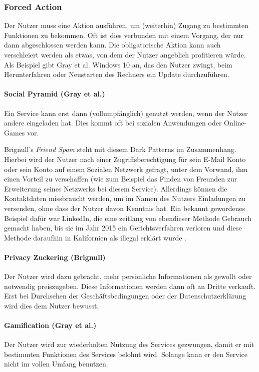 \documentclass[a4paper]{article}
\begin{document}
\subsubsection{Forced Action}
Der Nutzer muss eine Aktion ausführen, um (weiterhin) Zugang zu bestimmten Funktionen zu bekommen. Oft ist dies verbunden mit einem Vorgang, der nur dann abgeschlossen werden kann. Die obligatorische Aktion kann auch verschleiert werden als etwas, von dem der Nutzer angeblich profitieren würde. 
Als Beispiel gibt Gray et al. \cite{gray} Windows 10 an, das den Nutzer zwingt, beim Herunterfahren oder Neustarten des Rechners ein Update durchzuführen.  

\paragraph{Social Pyramid (Gray et al.)}
Ein Service kann erst dann (vollumpfänglich) genutzt werden, wenn der Nutzer andere eingeladen hat. Dies kommt oft bei sozialen Anwendungen oder Online-Games vor. 

Brignull's \textit{Friend Spam} steht mit diesem Dark Patterns im Zusammenhang. Hierbei wird der Nutzer nach einer Zugriffsberechtigung für sein E-Mail Konto oder sein Konto auf einem Sozialen Netzwerk gefragt, unter dem Vorwand, ihm einen Vorteil zu verschaffen (wie zum Beispiel das Finden von Freunden zur Erweiterung seines Netzwerks bei diesem Service). Allerdings können die Kontaktdaten missbraucht werden, um im Namen des Nutzers Einladungen zu versenden, ohne dass der Nutzer davon Kenntnis hat.
Ein bekannt gewordenes Beispiel dafür war LinkedIn, die eine zeitlang von ebendieser Methode Gebrauch gemacht haben, bis sie im Jahr 2015 ein Gerichtsverfahren verloren und diese Methode daraufhin in Kalifornien als illegal erklärt wurde \cite{brignull5}.   

\paragraph{Privacy Zuckering (Brignull)}
Der Nutzer wird dazu gebracht, mehr persönliche Informationen als gewollt oder notwendig preiszugeben. Diese Informationen werden dann oft an Dritte verkauft. Erst bei Durchsehen der Geschäftsbedingungen oder der Datenschutzerklärung wird dies dem Nutzer bewusst.

\paragraph{Gamification (Gray et al.)}
Der Nutzer wird zur wiederholten Nutzung des Services gezwungen, damit er mit bestimmten Funktionen des Services belohnt wird. Solange kann er den Service nicht im vollen Umfang benutzen. 
\end{document}
